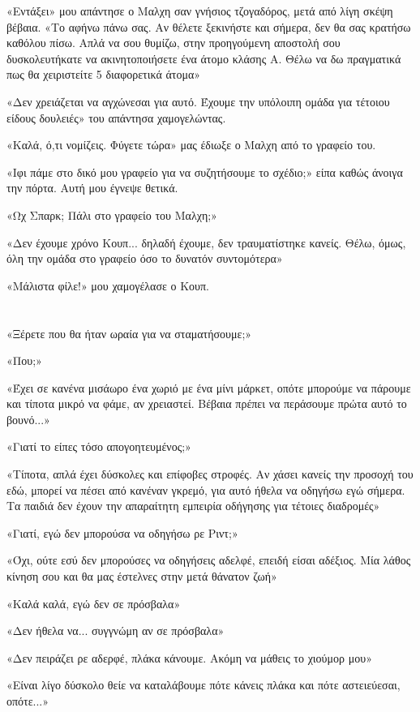 \documentclass[12pt,twoside, openany]{book}
\begin{document}
«Εντάξει» μου απάντησε ο Μαλχη σαν γνήσιος τζογαδόρος, μετά από λίγη σκέψη βέβαια. «Το αφήνω πάνω σας. Αν θέλετε ξεκινήστε και σήμερα, δεν θα σας κρατήσω καθόλου πίσω. Απλά να σου θυμίζω, στην προηγούμενη αποστολή σου δυσκολευτήκατε να ακινητοποιήσετε ένα άτομο κλάσης Α. Θέλω να δω πραγματικά πως θα χειριστείτε 5 διαφορετικά άτομα»

«Δεν χρειάζεται να αγχώνεσαι για αυτό. Έχουμε την υπόλοιπη ομάδα για τέτοιου είδους δουλειές» του απάντησα χαμογελώντας.

«Καλά, ό,τι νομίζεις. Φύγετε τώρα» μας έδιωξε ο Μαλχη από το γραφείο του.

«Ιφι πάμε στο δικό μου γραφείο για να συζητήσουμε το σχέδιο;» είπα καθώς άνοιγα την πόρτα. Αυτή μου έγνεψε θετικά.

«Ωχ Σπαρκ; Πάλι στο γραφείο του Μαλχη;»

«Δεν έχουμε χρόνο Κουπ... δηλαδή έχουμε, δεν τραυματίστηκε κανείς. Θέλω, όμως, όλη την ομάδα στο γραφείο όσο το δυνατόν συντομότερα»

«Μάλιστα φίλε!» μου χαμογέλασε ο Κουπ.

\chapter{}

«Ξέρετε που θα ήταν ωραία για να σταματήσουμε;»

«Που;»

«Έχει σε κανένα μισάωρο ένα χωριό με ένα μίνι μάρκετ, οπότε μπορούμε να πάρουμε και τίποτα μικρό να φάμε, αν χρειαστεί. Βέβαια πρέπει να περάσουμε πρώτα αυτό το βουνό...»

«Γιατί το είπες τόσο απογοητευμένος;»

«Τίποτα, απλά έχει δύσκολες και επίφοβες στροφές. Αν χάσει κανείς την προσοχή του εδώ, μπορεί να πέσει από κανέναν γκρεμό, για αυτό ήθελα να οδηγήσω εγώ σήμερα. Τα παιδιά δεν έχουν την απαραίτητη εμπειρία οδήγησης για τέτοιες διαδρομές»

«Γιατί, εγώ δεν μπορούσα να οδηγήσω ρε Ριντ;»

«Όχι, ούτε εσύ δεν μπορούσες να οδηγήσεις αδελφέ, επειδή είσαι αδέξιος. Μία λάθος κίνηση σου και θα μας έστελνες στην μετά θάνατον ζωή»

«Καλά καλά, εγώ δεν σε πρόσβαλα»

«Δεν ήθελα να... συγγνώμη αν σε πρόσβαλα»

«Δεν πειράζει ρε αδερφέ, πλάκα κάνουμε. Ακόμη να μάθεις το χιούμορ μου»

«Είναι λίγο δύσκολο θείε να καταλάβουμε πότε κάνεις πλάκα και πότε αστειεύεσαι, οπότε...»
\end{document}
